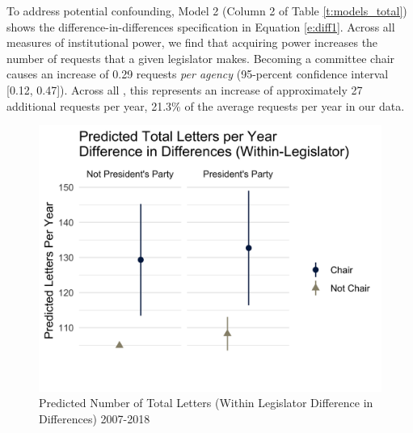 \documentclass[12pt]{article}
\begin{document}
To address potential confounding, Model 2 (Column 2 of Table \ref{t:models_total}) shows the difference-in-differences specification in Equation \ref{e:diff1}. Across all measures of institutional power, we find that acquiring power increases the number of requests that a given legislator makes. Becoming a committee chair causes an increase of  0.29 requests \textit{per agency} (95-percent confidence interval [0.12, 0.47]). Across all , this represents an increase of approximately 27 additional requests per year, 21.3\% of the average requests per year in our data. %




\begin{figure}[hbt!]
\centering
\caption{Predicted Number of Total Letters (Within Legislator Difference in Differences) 2007-2018} \label{f:m-total-predicted}
\includegraphics[width = .8\textwidth]{figs/m-total-predicted-3}
\end{figure}
\end{document}
